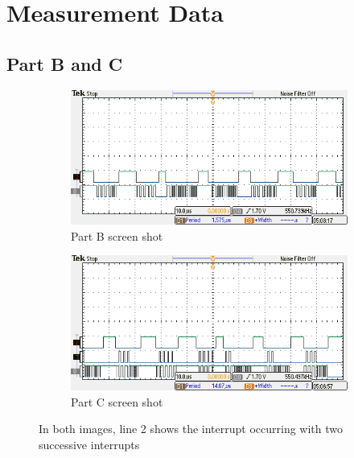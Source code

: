 \documentclass{article}
\begin{document}
\section{Measurement Data} %
	\subsection{Part B and C}
		\centering		
		\begin{figure}[h]
			\centering
			\begin{subfigure}{0.45\textwidth}
				\includegraphics[keepaspectratio, width=\textwidth]{Lab2Screens/Lab2PartB1.png}
				\caption{Part B screen shot}
				\label{fig:SS_B}
			\end{subfigure}
			\hfill
			\begin{subfigure}{0.45\textwidth}
				\includegraphics[keepaspectratio, width=\textwidth]{Lab2Screens/Lab2PartC5}	
				\caption{Part C screen shot}
				\label{fig:SS_C}
			\end{subfigure}
			\caption{In both images, line 2 shows the interrupt occurring with two successive interrupts}
			\label{fig:SS_B&C}			
			\hfill		
		\end{figure}
		\raggedright		
		
\end{document}
